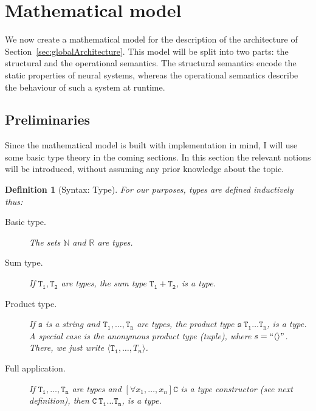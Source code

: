\documentclass[]{scrartcl}
\theoremstyle{break}
\newtheorem{definition}{Definition}
\newcommand{\N}{\mathbb{N}}
\newcommand{\R}{\mathbb{R}}
\newcommand{\allQ}[1]{\left[\forall #1 \right]}
\newcommand{\type}[1]{\mathtt{#1}}
\newcommand{\lp}{{\rm (}}
\newcommand{\rp}{{\rm )}}
\newcommand{\paren}[1]{\lp{#1}\rp}
\begin{document}
\section{Mathematical model}\label{sec:mathematicalModel}

We now create a mathematical model for the description of the architecture of Section~\ref{sec:globalArchitecture}. This model will be split into two parts: the structural and the operational semantics. The structural semantics encode the static properties of neural systems, whereas the operational semantics describe the behaviour of such a system at runtime.

\subsection{Preliminaries}\label{sec:mathematicalPreliminaries}

Since the mathematical model is built with implementation in mind, I will use some basic type theory in the coming sections. In this section the relevant notions will be introduced, without assuming any prior knowledge about the topic.

\begin{definition}[Syntax: Type]\label{def:type}
For our purposes, types are defined inductively thus:
	\begin{description}
		\item[Basic type.] The sets $\N$ and $\R$ are types.
		\item[Sum type.] If $\type{T_1},\type{T_2}$ are types, the sum type $\type{T_1 + T_2}$, is a type. 
		\item[Product type.] If $\type{s}$ is a string and $\type{T_1},\dots,\type{T_n}$ are types, the product type $\type{s}\ \type{T_1} \dots \type{T_n}$, is a type. A special case is the {\em anonymous product type} \paren{tuple}, where $s=``\langle\rangle"$. There, we just write $\langle\type{T_1},\dots,T_n \rangle$.
		\item[Full application.] If $\type{T_1},\dots,\type{T_n}$ are types and $\allQ{x_1,\dots,x_n} \type{C}$ is a type constructor \paren{see next definition}, then $\type{C\ T_1} \dots \type{T_n}$, is a type.
	\end{description}
\end{definition}
\end{document}
